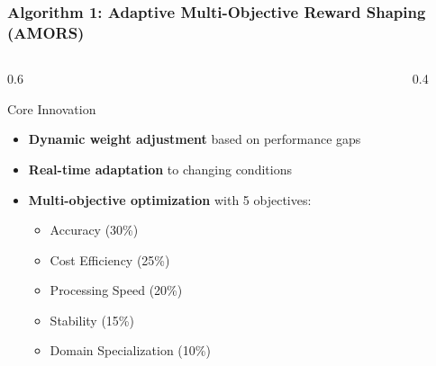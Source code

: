 \documentclass{beamer}
\begin{document}
\begin{frame}
\frametitle{Algorithm 1: Adaptive Multi-Objective Reward Shaping (AMORS)}
\begin{columns}
\begin{column}{0.6\textwidth}
\begin{block}{Core Innovation}
\begin{itemize}
\item \textbf{Dynamic weight adjustment} based on performance gaps
\item \textbf{Real-time adaptation} to changing conditions
\item \textbf{Multi-objective optimization} with 5 objectives:
    \begin{itemize}
    \item Accuracy (30\%)
    \item Cost Efficiency (25\%)
    \item Processing Speed (20\%)
    \item Stability (15\%)
    \item Domain Specialization (10\%)
    \end{itemize}
\end{itemize}
\end{block}
\end{column}
\begin{column}{0.4\textwidth}
\begin{center}
\end{center}
\end{column}
\end{columns}
\end{frame}
\end{document}
